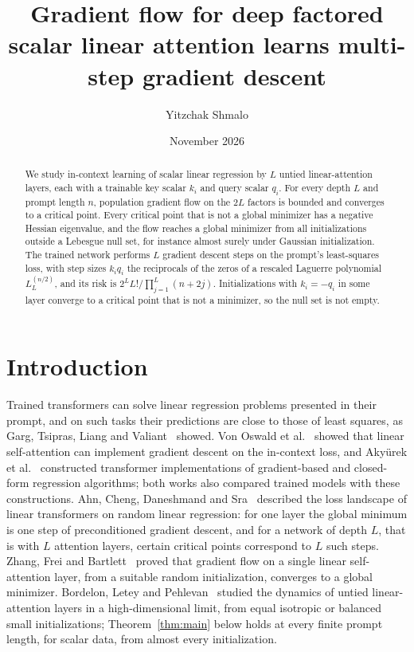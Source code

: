 \documentclass[11pt]{amsart}
\title[Gradient flow for factored scalar linear attention]{Gradient flow for deep factored scalar linear attention learns multi-step gradient descent}
\author{Yitzchak Shmalo}
\date{November 2026}
\theoremstyle{remark}
\numberwithin{equation}{section}
\begin{document}
\begin{abstract}
We study in-context learning of scalar linear regression by $L$ untied linear-attention layers, each with a trainable key scalar $k_i$ and query scalar $q_i$. For every depth $L$ and prompt length $n$, population gradient flow on the $2L$ factors is bounded and converges to a critical point. Every critical point that is not a global minimizer has a negative Hessian eigenvalue, and the flow reaches a global minimizer from all initializations outside a Lebesgue null set, for instance almost surely under Gaussian initialization. The trained network performs $L$ gradient descent steps on the prompt's least-squares loss, with step sizes $k_iq_i$ the reciprocals of the zeros of a rescaled Laguerre polynomial $L_L^{(n/2)}$, and its risk is $2^LL!/\prod_{j=1}^{L}(n+2j)$. Initializations with $k_i=-q_i$ in some layer converge to a critical point that is not a minimizer, so the null set is not empty.
\end{abstract}
\maketitle

\section{Introduction}\label{sec:intro}
Trained transformers can solve linear regression problems presented in their prompt, and on such tasks their predictions are close to those of least squares, as Garg, Tsipras, Liang and Valiant~\cite{Garg} showed. Von Oswald et al.~\cite{vonOswald} showed that linear self-attention can implement gradient descent on the in-context loss, and Aky\"urek et al.~\cite{Akyurek} constructed transformer implementations of gradient-based and closed-form regression algorithms; both works also compared trained models with these constructions. Ahn, Cheng, Daneshmand and Sra~\cite{Ahn} described the loss landscape of linear transformers on random linear regression: for one layer the global minimum is one step of preconditioned gradient descent, and for a network of depth $L$, that is with $L$ attention layers, certain critical points correspond to $L$ such steps. Zhang, Frei and Bartlett~\cite{ZFB} proved that gradient flow on a single linear self-attention layer, from a suitable random initialization, converges to a global minimizer. Bordelon, Letey and Pehlevan~\cite{BLP} studied the dynamics of untied linear-attention layers in a high-dimensional limit, from equal isotropic or balanced small initializations; Theorem~\ref{thm:main} below holds at every finite prompt length, for scalar data, from almost every initialization.
\end{document}
